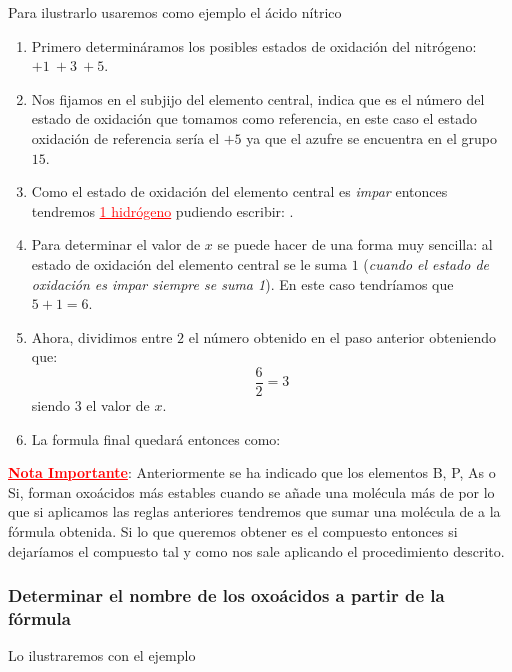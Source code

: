 \documentclass[11pt, a4paper]{article}
\begin{document}
Para ilustrarlo usaremos como ejemplo el ácido nítrico

\begin{enumerate}[label=\numberballgreen]
    \item Primero determináramos los posibles estados de oxidación del nitrógeno: $+1\ +3\ +5$.
    \item Nos fijamos en el subjijo del elemento central,  indica que es el número del estado de oxidación que tomamos como referencia, en este caso el estado oxidación de referencia sería el $+5$ ya que el azufre se encuentra en el grupo $15$.
    \item Como el estado de oxidación del elemento central es \textit{impar} entonces tendremos \textcolor{red}{\uline{1 hidrógeno}} pudiendo escribir: .
    \item Para determinar el valor de $x$ se puede hacer de una forma muy sencilla: al estado de oxidación del elemento central se le suma $1$ (\textit{cuando el estado de oxidación es impar siempre se suma 1}). En este caso tendríamos que $5 + 1 = 6$.
    \item Ahora, dividimos entre $2$ el número obtenido en el paso anterior obteniendo que:
          \[\frac{6}{2} = 3\]
          siendo $3$ el valor de $x$.
    \item La formula final quedará entonces como: 
\end{enumerate}

\textbf{\textcolor{red}{\uline{Nota Importante}}}: Anteriormente se ha indicado que los elementos B, P, As o Si, forman oxoácidos más estables cuando se añade una molécula más de  por lo que si aplicamos las reglas anteriores tendremos que sumar una molécula de  a la fórmula obtenida. Si lo que queremos obtener es el compuesto  entonces si dejaríamos el compuesto tal y como nos sale aplicando el procedimiento descrito.


\subsubsection{Determinar el nombre de los oxoácidos a partir de la fórmula}

Lo ilustraremos con el ejemplo 
\end{document}
